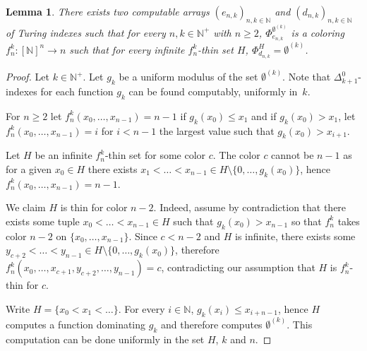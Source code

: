 \documentclass{article}
\newcommand{\NN}[0]{\mathbb{N}}
\numberwithin{theorem}{section}
\newtheorem{lemma}[theorem]{Lemma}
\begin{document}
\begin{lemma}\label{lem:arrays}
    There exists two computable arrays $(e_{n,k})_{n,k \in \NN}$ and $(d_{n,k})_{n,k \in \NN}$ of Turing indexes such that for every $n, k \in \NN^+$ with $n \geq 2$, $\Phi_{e_{n,k}}^{\emptyset^{(k)}}$ is a coloring $f_n^k : [\NN]^{n} \to n$ such that for every infinite $f_n^k$-thin set $H$, $\Phi_{d_{n,k}}^{H} = \emptyset^{(k)}$.
\end{lemma}

\begin{proof}
Let $k\in\NN^+$. Let $g_k$ be a uniform modulus of the set $\emptyset^{(k)}$. Note that $\Delta^0_{k+1}$-indexes for each function $g_k$ can be found computably, uniformly in~$k$. 

For $n \geq 2$ let $f_n^k(x_0, \dots,x_{n-1}) = n - 1$ if $g_k(x_0) \leq x_1$ and if $g_k(x_0) > x_1$, let $f_n^k(x_0, \dots,x_{n-1}) = i$ for $i < n - 1$ the largest value such that $g_k(x_0) > x_{i+1}$.

Let $H$ be an infinite $f_n^k$-thin set for some color $c$. The color $c$ cannot be $n-1$ as for a given $x_0 \in H$ there exists $x_1 <\dots < x_{n-1} \in H \setminus \{0, \dots, g_k(x_0)\}$, hence $f^k_n(x_0, \dots, x_{n-1}) = n-1$.

We claim $H$ is thin for color $n-2$. Indeed, assume by contradiction that there exists some tuple $x_0 < \dots < x_{n-1} \in H$ such that $g_k(x_0) > x_{n-1}$ so that $f^k_n$ takes color $n-2$ on $\{x_0, \dots, x_{n-1}\}$. Since $c < n-2$ and $H$ is infinite, there exists some $y_{c+2}< \dots < y_{n-1} \in H \setminus \{0, \dots ,g_k(x_0)\}$, therefore $f^k_n(x_0, \dots, x_{c+1},y_{c+2}, \dots, y_{n-1}) = c$, contradicting our assumption that $H$ is $f_n^k$-thin for $c$.

Write $H = \{x_0 < x_1 < \dots \}$. For every $i \in \NN$, $g_k(x_i) \leq x_{i + n - 1}$, hence $H$ computes a function dominating $g_k$ and therefore computes $\emptyset^{(k)}$. This computation can be done uniformly in the set $H$, $k$ and $n$. 
\end{proof}
\end{document}
